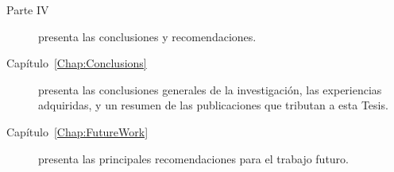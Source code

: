 \begin{description}
\item[Parte IV] presenta las conclusiones y recomendaciones.

\item [Capítulo~\ref{Chap:Conclusions}] presenta las conclusiones generales de la investigación, las experiencias adquiridas, y un resumen de las publicaciones que tributan a esta Tesis.

\item [Capítulo~\ref{Chap:FutureWork}] presenta las principales recomendaciones para el trabajo futuro.
\end{description}
